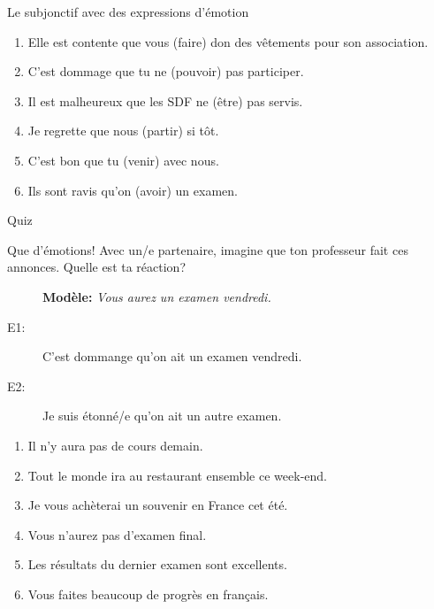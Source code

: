\documentclass{beamer}
\begin{document}
  \begin{frame}{Le subjonctif avec des expressions d'émotion}
    \begin{enumerate}
      \item Elle est contente que vous \underline{} (faire) don des vêtements pour son association.
      \item C'est dommage que tu ne \underline{} (pouvoir) pas participer.
      \item Il est malheureux que les SDF ne \underline{} (être) pas servis.
      \item Je regrette que nous \underline{} (partir) si tôt.
      \item C'est bon que tu \underline{} (venir) avec nous.
      \item Ils sont ravis qu'on \underline{} (avoir) un examen.
    \end{enumerate}
  \end{frame}

  \begin{frame}{}
    \begin{center}
      \Large Quiz
    \end{center}
  \end{frame}

  \begin{frame}{Que d'émotions!}
    Avec un/e partenaire, imagine que ton professeur fait ces annonces.
    Quelle est ta réaction?
    \begin{description}
      \item[] \textbf{Modèle:} \emph{Vous aurez un examen vendredi.}
      \item[E1:] \alert{C'est dommange qu}'on ait un examen vendredi.
      \item[E2:] \alert{Je suis étonné/e} qu'on ait un autre examen.
    \end{description}
    \begin{enumerate}
      \item Il n'y aura pas de cours demain.
      \item Tout le monde ira au restaurant ensemble ce week-end.
      \item Je vous achèterai un souvenir en France cet été.
      \item Vous n'aurez pas d'examen final.
      \item Les résultats du dernier examen sont excellents.
      \item Vous faites beaucoup de progrès en français.
    \end{enumerate}
  \end{frame}
\end{document}
